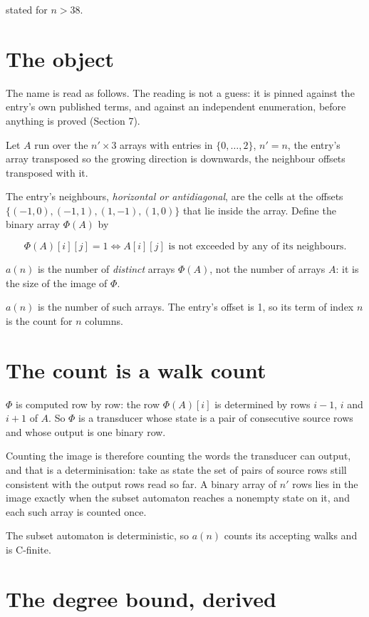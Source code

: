 \documentclass[11pt]{article}
\theoremstyle{definition}
\begin{document}
stated for $n > 38$.

\section{The object}

The name is read as follows. The reading is not a guess: it is pinned against the entry's own published terms, and against an independent enumeration, before anything is proved (Section 7).

Let $A$ run over the $n' \times 3$ arrays with entries in $\{0,\dots,2\}$, $n' = n$, the entry's array transposed so the growing direction is downwards, the neighbour offsets transposed with it.

The entry's neighbours, {\itshape horizontal or antidiagonal}, are the cells at the offsets $\{(-1,0), (-1,1), (1,-1), (1,0)\}$ that lie inside the array. Define the binary array $\Phi(A)$ by

\[\Phi(A)[i][j] = 1 \iff A[i][j] \text{ is not exceeded by any of its neighbours}.\]

$a(n)$ is the number of {\itshape distinct} arrays $\Phi(A)$, not the number of arrays $A$: it is the size of the image of $\Phi$.

$a(n)$ is the number of such arrays. The entry's offset is 1, so its term of index $n$ is the count for $n$ columns.

\section{The count is a walk count}

$\Phi$ is computed row by row: the row $\Phi(A)[i]$ is determined by rows $i-1$, $i$ and $i+1$ of $A$. So $\Phi$ is a transducer whose state is a pair of consecutive source rows and whose output is one binary row.

Counting the image is therefore counting the words the transducer can output, and that is a determinisation: take as state the set of pairs of source rows still consistent with the output rows read so far. A binary array of $n'$ rows lies in the image exactly when the subset automaton reaches a nonempty state on it, and each such array is counted once.

The subset automaton is deterministic, so $a(n)$ counts its accepting walks and is C-finite.

\section{The degree bound, derived}
\end{document}
